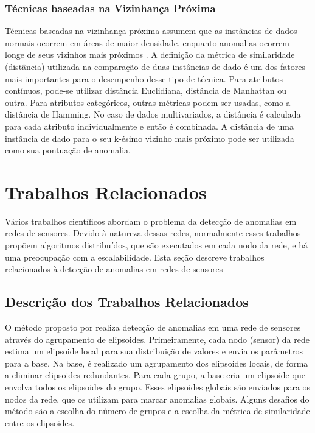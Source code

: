 \documentclass[cic,tc]{iiufrgs}
\begin{document}
\subsubsection{Técnicas baseadas na Vizinhança Próxima}
Técnicas baseadas na vizinhança próxima assumem que as instâncias de dados normais ocorrem em áreas de maior densidade, enquanto anomalias ocorrem longe de seus vizinhos mais próximos \cite{AnomalyDetectionSurvey2009}. A definição da métrica de similaridade (distância) utilizada na comparação de duas instâncias de dado é um dos fatores mais importantes para o desempenho desse tipo de técnica. Para atributos contínuos, pode-se utilizar distância Euclidiana, distância de Manhattan ou outra. Para atributos categóricos, outras métricas podem ser usadas, como a distância de Hamming. No caso de dados multivariados, a distância é calculada para cada atributo individualmente e então é combinada. A distância de uma instância de dado para o seu k-ésimo vizinho mais próximo pode ser utilizada como sua pontuação de anomalia.

\section{Trabalhos Relacionados}
\label{trab_rel}
Vários trabalhos científicos abordam o problema da detecção de anomalias em redes de sensores. Devido à natureza dessas redes, normalmente esses trabalhos propõem algoritmos distribuídos, que são executados em cada nodo da rede, e há uma preocupação com a escalabilidade. Esta seção descreve trabalhos relacionados à detecção de anomalias em redes de sensores

\subsection{Descrição dos Trabalhos Relacionados}
O método proposto por \cite{Ellipsoids2009} realiza detecção de anomalias em uma rede de sensores através do agrupamento de elipsoides. Primeiramente, cada nodo (sensor) da rede estima um elipsoide local para sua distribuição de valores e envia os parâmetros para a base. Na base, é realizado um agrupamento dos elipsoides locais, de forma a eliminar elipsoides redundantes. Para cada grupo, a base cria um elipsoide que envolva todos os elipsoides do grupo. Esses elipsoides globais são enviados para os nodos da rede, que os utilizam para marcar anomalias globais. Alguns desafios do método são a escolha do número de grupos e a escolha da métrica de similaridade entre os elipsoides.
\end{document}
